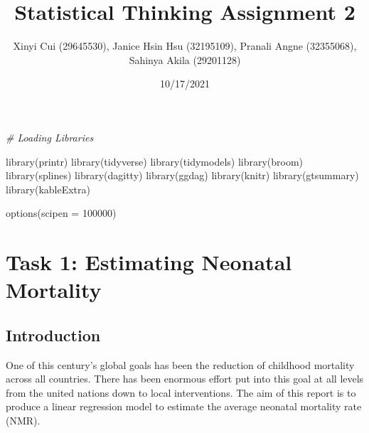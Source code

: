 \documentclass[
]{article}
\title{Statistical Thinking Assignment 2}
\author{Xinyi Cui (29645530), Janice Hsin Hsu (32195109), Pranali Angne
(32355068), Sahinya Akila (29201128)}
\date{10/17/2021}
\newenvironment{Shaded}{\begin{snugshade}}{\end{snugshade}}
\newcommand{\AttributeTok}[1]{\textcolor[rgb]{0.77,0.63,0.00}{#1}}
\newcommand{\CommentTok}[1]{\textcolor[rgb]{0.56,0.35,0.01}{\textit{#1}}}
\newcommand{\ConstantTok}[1]{\textcolor[rgb]{0.00,0.00,0.00}{#1}}
\newcommand{\DecValTok}[1]{\textcolor[rgb]{0.00,0.00,0.81}{#1}}
\newcommand{\FunctionTok}[1]{\textcolor[rgb]{0.00,0.00,0.00}{#1}}
\newcommand{\NormalTok}[1]{#1}
\newcommand{\SpecialCharTok}[1]{\textcolor[rgb]{0.00,0.00,0.00}{#1}}
\begin{document}
\maketitle

\newpage

\begin{Shaded}
\end{Shaded}

\begin{Shaded}
\begin{Highlighting}[]
\CommentTok{\# Loading Libraries}

\FunctionTok{library}\NormalTok{(printr)}
\FunctionTok{library}\NormalTok{(tidyverse)}
\FunctionTok{library}\NormalTok{(tidymodels)}
\FunctionTok{library}\NormalTok{(broom)}
\FunctionTok{library}\NormalTok{(splines)}
\FunctionTok{library}\NormalTok{(dagitty)}
\FunctionTok{library}\NormalTok{(ggdag)}
\FunctionTok{library}\NormalTok{(knitr)}
\FunctionTok{library}\NormalTok{(gtsummary)}
\FunctionTok{library}\NormalTok{(kableExtra)}

\FunctionTok{options}\NormalTok{(}\AttributeTok{scipen =} \DecValTok{100000}\NormalTok{)}
\end{Highlighting}
\end{Shaded}

\hypertarget{task-1-estimating-neonatal-mortality}{%
\section{Task 1: Estimating Neonatal
Mortality}\label{task-1-estimating-neonatal-mortality}}

\hypertarget{introduction}{%
\subsection{Introduction}\label{introduction}}

One of this century's global goals has been the reduction of childhood
mortality across all countries. There has been enormous effort put into
this goal at all levels from the united nations down to local
interventions. The aim of this report is to produce a linear regression
model to estimate the average neonatal mortality rate (NMR).
\end{document}

